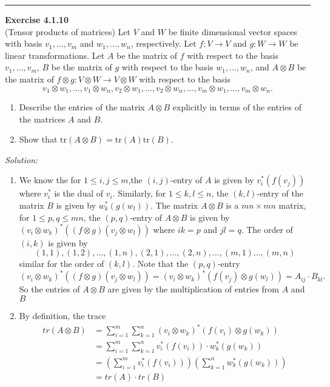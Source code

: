 \documentclass[a4paper, 12pt]{article}
\newenvironment{problem}[2][Exercise]
    { \begin{mdframed}[backgroundcolor=gray!20] \textbf{#1 #2} \\}
    {  \end{mdframed}}
\newenvironment{solution}
    {\textit{Solution:}}
    {}
\begin{document}
\noindent\rule{7in}{2.8pt}
\begin{problem}{4.1.10}
(Tensor products of matrices) Let \(V\) and \(W\) be finite dimensional vector spaces with basis \(v_1,\ldots,v_m\) and \(w_1,\ldots,w_n\), respectively. Let \(f:V\rightarrow V\) and 
\(g:W\rightarrow W\) be linear transformations. Let \(A\) be the matrix of \(f\) with respect to the basis \(v_1,\ldots, v_m\), \(B\) be the matrix of \(g\) with respect to the basis 
\(w_1,\ldots,w_n\), and \(A\otimes B\) be the matrix of \(f\otimes g:V\otimes W\rightarrow V\otimes W\) with respect to the basis 
\[v_1\otimes w_1,\ldots,v_1\otimes w_n,v_2\otimes w_1,\ldots,v_2\otimes w_n,\ldots, v_m\otimes w_1,\ldots,v_m\otimes w_n.\]
\begin{enumerate}[(1)]
	\item Describe the entries of the matrix \(A\otimes B\) explicitly in terms of the entries of the matrices \(A\) and \(B\).
	\item Show that \(\text{tr}(A\otimes B)=\text{tr}(A)\text{tr}(B)\).
\end{enumerate}
\end{problem}
\begin{solution}
\begin{enumerate}[(1)]
\item  We know the for \(1\leq i,j\leq m\),the \((i,j)\)-entry of \(A\) is given by \(v_i^*(f(v_j))\) where \(v_i^*\) is the dual of \(v_i\). Similarly, for \(1\leq k,l\leq n\), the \((k,l)\)-entry 
       of the matrix \(B\) is given by \(w_k^*(g(w_l))\). The matrix \(A\otimes B\) is a \(mn\times mn\) matrix, for \(1\leq p,q\leq mn\), the \((p,q)\)-entry of \(A\otimes B\) 
	   is given by \((v_i\otimes w_k)^*((f\otimes g)(v_j\otimes w_l))\) where \(ik=p\) and \(jl=q\). The order of \((i,k)\) is given by 
	   \[(1,1),(1,2),\ldots,(1,n),(2,1),\ldots,(2,n),\ldots,(m,1)\ldots,(m,n)\]
	   similar for the order of \((k,l)\). Note that the \((p,q)\)-entry
	   \[(v_i\otimes w_k)^*((f\otimes g)(v_j\otimes w_l))=(v_i\otimes w_k)^*(f(v_j)\otimes g(w_l))=A_{ij}\cdot B_{kl}.\]
       So the entries of \(A\otimes B\) are given by the multiplication of entries from \(A\) and \(B\)
\item By definition, the trace 
\begin{align*}
	tr(A\otimes B) & = \sum_{i=1}^{m}\sum_{k=1}^{n} (v_i\otimes w_k)^*(f(v_i)\otimes g(w_k))\\ 
	               & =\sum_{i=1}^{m}\sum_{k=1}^{n} v_i^*(f(v_i))\cdot w_k^*(g(w_k))\\ 
				   & =(\sum_{i=1}^{m}v_i^*(f(v_i)))(\sum_{k=1}^{n}w_k^*(g(w_k)))\\ 
				   & =tr(A)\cdot tr(B)
\end{align*}
\end{enumerate}
\end{solution}
\end{document}
